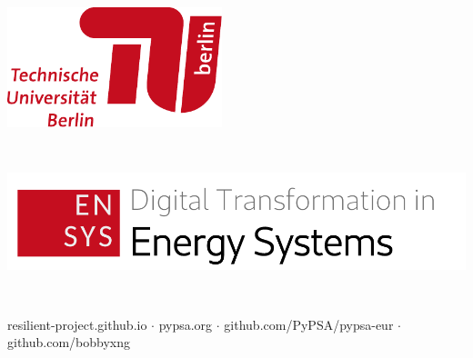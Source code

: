 \documentclass[a0,portrait]{a0poster}
\begin{document}
\noindent
\begin{minipage}[b][2cm][t]{0.753\linewidth} 
  \vspace{1em}
  \begin{minipage}{0.15\textwidth}
    \includegraphics[height=3.5cm]{tub-logo.pdf}
  \end{minipage}
  \begin{minipage}{0.2\textwidth}
    \includegraphics[height=4.5cm]{ensys-logo-en.pdf}
  \end{minipage}
  \vspace{2.3em}

  \begin{minipage}{0.9\textwidth}
    \makeatletter
    \raggedright{\fontsize{75pt}{65pt}\selectfont\color{red100}\textbf{{\@title}}\par}
    \makeatother
    \color{Black}
    \vspace{0.3cm}
    \hspace{0.005em}
    resilient-project.github.io $\cdot$ pypsa.org $\cdot$ github.com/PyPSA/pypsa-eur $\cdot$ github.com/bobbyxng
  \end{minipage}
\end{minipage}%
%
\end{document}
